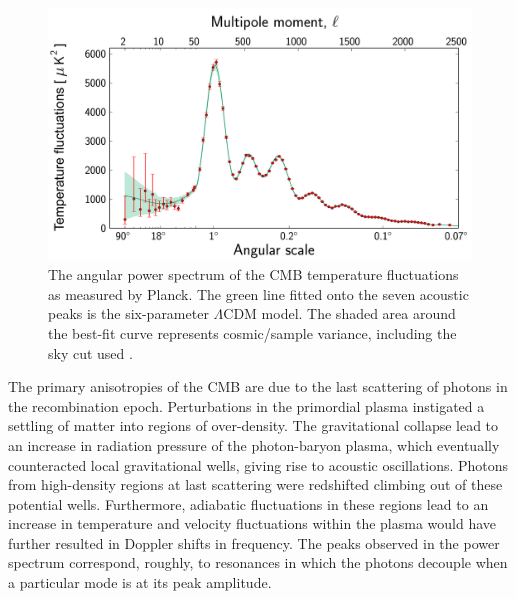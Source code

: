 \begin{figure}[ht!]
    \begin{center}
        \includegraphics[scale=0.15]{Chapter_1/Figures/Planck_power_spectrum.jpg}
        \caption[The angular power spectrum of the CMB temperature fluctuations as measured by Planck.]%
        {The angular power spectrum of the CMB temperature fluctuations as measured by Planck. The green line fitted onto the seven acoustic peaks is the six-parameter $\Lambda$CDM model. The shaded area around the best-fit curve represents cosmic/sample variance, including the sky cut used \cite{Plank_2018}.}
        \label{fig:cmb_power_spectrum}
        \end{center}
\end{figure}

The primary anisotropies of the CMB are due to the last scattering of photons in the recombination epoch. Perturbations in the primordial plasma instigated a settling of matter into regions of over-density. The gravitational collapse lead to an increase in radiation pressure of the photon-baryon plasma, which eventually counteracted local gravitational wells, giving rise to acoustic oscillations. Photons from high-density regions at last scattering were redshifted climbing out of these potential wells. Furthermore, adiabatic fluctuations in these regions lead to an increase in temperature and velocity fluctuations within the plasma would have further resulted in Doppler shifts in frequency. The peaks observed in the power spectrum correspond, roughly, to resonances in which the photons decouple when a particular mode is at its peak amplitude.

